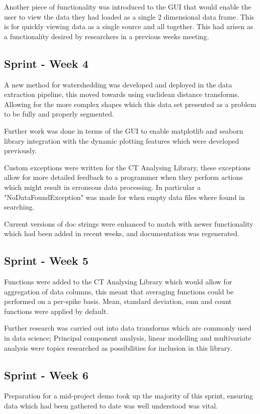 \documentclass[11pt]{report}
\begin{document}
Another piece of functionality was introduced to the GUI that would enable the user to view the data they had loaded as a single 2 dimensional data frame. This is for quickly viewing data as a single source and all together. This had arisen as a functionality desired by researchers in a previous weeks meeting.

\subsection{Sprint - Week 4}
\label{sec:org38fbf1b}
A new method for watershedding was developed and deployed in the data extraction pipeline, this moved towards using euclidean distance transforms. Allowing for the more complex shapes which this data set presented as a problem to be fully and properly segmented.

Further work was done in terms of the GUI to enable matplotlib and seaborn library integration with the dynamic plotting features which were developed previously.

Custom exceptions were written for the CT Analysing Library, these exceptions allow for more detailed feedback to a programmer when they perform actions which might result in erroneous data processing. In particular a "NoDataFoundException" was made for when empty data files where found in searching.

Current versions of doc strings were enhanced to match with newer functionality which had been added in recent weeks, and documentation was regenerated.

\subsection{Sprint - Week 5}
\label{sec:org0d57643}
Functions were added to the CT Analysing Library which would allow for aggregation of data columns, this meant that averaging functions could be performed on a per-spike basis. Mean, standard deviation, sum and count functions were applied by default.

Further research was carried out into data transforms which are commonly used in data science; Principal component analysis, linear modelling and multivariate analysis were topics researched as possibilities for inclusion in this library.

\subsection{Sprint - Week 6}
\label{sec:org567e08e}
Preparation for a mid-project demo took up the majority of this sprint, ensuring data which had been gathered to date was well understood was vital.
\end{document}
